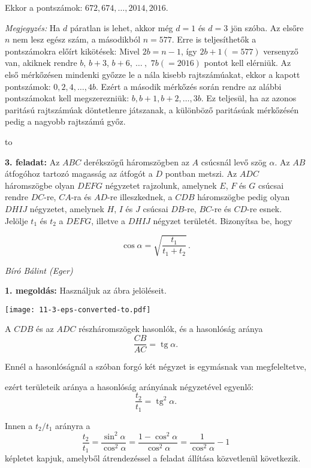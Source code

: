 \documentclass[a4paper,10pt]{article}
\newcommand{\ki}[2]{\hfill {\it #1 (#2)}\medskip}
\newcommand{\vonal}{\hbox to \hsize{\hskip2truecm\hrulefill\hskip2truecm}}
\newcommand{\tg}{\mathop{\mathrm{tg}}\nolimits}
\begin{document}
\noindent Ekkor a pontszámok: $672, 674,\dots, 2014, 2016$.

\medskip

\emph{Megjegyzés:} Ha $d$ páratlan is lehet, akkor még $d=1$ és
$d=3$ jön szóba. Az elsőre $n$ nem lesz egész szám, a másodikból $n=577$. 
Erre is teljesíthetők a pontszámokra előírt kikötések:
Mivel $2b=n-1$, így $2b+1(=577)$ versenyző van, akiknek 
rendre
$b$, $b+3$, $b+6,\ \dots\ ,$ $7b(=2016)$ pontot kell elérniük. Az első mérkőzésen
mindenki győzze le a nála kisebb rajtszámúakat, ekkor a kapott pontszámok:
$0, 2, 4, \dots, 4b$. Ezért a második mérkőzés során rendre az alábbi
pontszámokat kell megszerezniük: $b,b+1,b+2,\dots,3b$. Ez teljesül, ha az 
azonos paritású rajtszámúak döntetlenre játszanak, a különböző paritásúak
mérkőzésén pedig a nagyobb rajtszámú győz.


\vonal

{\bf 3. feladat: } Az $ABC$ derékszögű háromszögben az $A$ csúcsnál levő szög $\alpha$. Az $AB$ átfogóhoz tartozó magasság az átfogót a $D$ pontban metszi. Az $ADC$ háromszögbe olyan $DEFG$ négyzetet rajzolunk, amelynek $E$, $F$ és $G$ csúcsai rendre $DC$-re, $CA$-ra és $AD$-re illeszkednek, a $CDB$ háromszögbe pedig olyan $DHIJ$ négyzetet, amelynek $H$, $I$ és $J$ csúcsai $DB$-re, $BC$-re és $CD$-re esnek. Jelölje $t_1$ és $t_2$ a $DEFG$, illetve a $DHIJ$ négyzet területét. Bizonyítsa be, hogy 

\[\cos\alpha =\sqrt{\frac{t_1}{t_1+t_2}}\,.\]

\ki{Bíró Bálint}{Eger}\medskip

{\bf 1. megoldás:} Használjuk az ábra jelöléseit.

\begin{center}
\texttt{[image: 11-3-eps-converted-to.pdf]}
\end{center}

\noindent A $CDB$ és az $ADC$ részháromszögek hasonlók, és a hasonlóság aránya 
\[\frac{CB}{AC}=\tg\alpha.\] 

\noindent Ennél a hasonlóságnál a szóban forgó két négyzet is egymásnak van megfeleltetve, 

\noindent ezért területeik aránya a hasonlóság arányának négyzetével egyenlő:
\[\frac{t_2}{t_1}=\tg ^2\alpha .\]

\noindent Innen a $t_2/t_1$ arányra a
\[\frac{t_2}{t_1}=\frac{\sin ^2\alpha}{\cos ^2\alpha}=\frac{1-\cos ^2\alpha}{\cos ^2\alpha}=\frac{1}{\cos ^2\alpha}-1\]
képletet kapjuk, amelyből átrendezéssel a feladat állítása közvetlenül következik.
\end{document}
